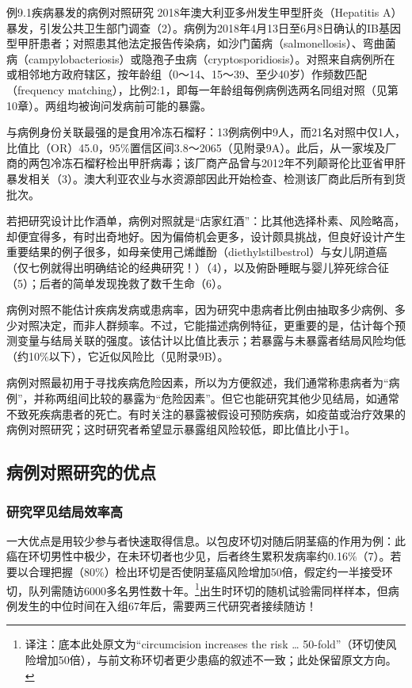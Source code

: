 \begin{bookbox}{例9.1\quad 疾病暴发的病例对照研究}
2018年澳大利亚多州发生甲型肝炎（Hepatitis A）暴发，引发公共卫生部门调查（2）。病例为2018年4月13日至6月8日确认的IB基因型甲肝患者；对照患其他法定报告传染病，如沙门菌病（salmonellosis）、弯曲菌病（campylobacteriosis）或隐孢子虫病（cryptosporidiosis）。对照来自病例所在或相邻地方政府辖区，按年龄组（0～14、15～39、至少40岁）作频数匹配（frequency matching），比例2:1，即每一年龄组每例病例选两名同组对照（见第10章）。两组均被询问发病前可能的暴露。

与病例身份关联最强的是食用冷冻石榴籽：13例病例中9人，而21名对照中仅1人，比值比（OR）45.0，95\%置信区间3.8～2065（见附录9A）。此后，从一家埃及厂商的两包冷冻石榴籽检出甲肝病毒；该厂商产品曾与2012年不列颠哥伦比亚省甲肝暴发相关（3）。澳大利亚农业与水资源部因此开始检查、检测该厂商此后所有到货批次。
\end{bookbox}

若把研究设计比作酒单，病例对照就是“店家红酒”：比其他选择朴素、风险略高，却便宜得多，有时出奇地好。因为偏倚机会更多，设计颇具挑战，但良好设计产生重要结果的例子很多，如母亲使用己烯雌酚（diethylstilbestrol）与女儿阴道癌（仅七例就得出明确结论的经典研究！）（4），以及俯卧睡眠与婴儿猝死综合征（5）；后者的简单发现挽救了数千生命（6）。

病例对照不能估计疾病发病或患病率，因为研究中患病者比例由抽取多少病例、多少对照决定，而非人群频率。不过，它能描述病例特征，更重要的是，估计每个预测变量与结局关联的强度。该估计以比值比表示；若暴露与未暴露者结局风险均低（约10\%以下），它近似风险比（见附录9B）。

病例对照最初用于寻找疾病危险因素，所以为方便叙述，我们通常称患病者为“病例”，并称两组间比较的暴露为“危险因素”。但它也能研究其他少见结局，如通常不致死疾病患者的死亡。有时关注的暴露被假设可预防疾病，如疫苗或治疗效果的病例对照研究；这时研究者希望显示暴露组风险较低，即比值比小于1。

\subsection{病例对照研究的优点}
\subsubsection{研究罕见结局效率高}
一大优点是用较少参与者快速取得信息。以包皮环切对随后阴茎癌的作用为例：此癌在环切男性中极少，在未环切者也少见，后者终生累积发病率约0.16\%（7）。若要以合理把握（80\%）检出环切是否使阴茎癌风险增加50倍，假定约一半接受环切，队列需随访6000多名男性数十年。\footnote{译注：底本此处原文为“circumcision increases the risk … 50-fold”（环切使风险增加50倍），与前文称环切者更少患癌的叙述不一致；此处保留原文方向。}出生时环切的随机试验需同样样本，但病例发生的中位时间在入组67年后，需要两三代研究者接续随访！

